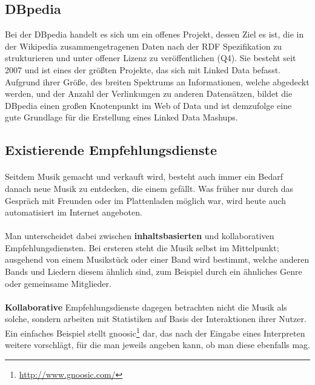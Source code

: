 \subsection{DBpedia}

Bei der DBpedia handelt es sich um ein offenes Projekt, dessen Ziel es ist, die in der Wikipedia zusammengetragenen Daten nach der RDF Spezifikation zu strukturieren und unter offener Lizenz zu veröffentlichen (Q4). Sie besteht seit 2007 und ist eines der größten Projekte, das sich mit Linked Data befasst. Aufgrund ihrer Größe, des breiten Spektrums an Informationen, welche abgedeckt werden, und der Anzahl der Verlinkungen zu anderen Datensätzen, bildet die DBpedia einen großen Knotenpunkt im Web of Data und ist demzufolge eine gute Grundlage für die Erstellung eines Linked Data Mashups.


\subsection{Existierende Empfehlungsdienste}
\paragraph{} Seitdem Musik gemacht und verkauft wird, besteht auch immer ein Bedarf danach neue Musik zu entdecken, die einem gefällt. Was früher nur durch das Gespräch mit Freunden oder im Plattenladen möglich war, wird heute auch automatisiert im Internet angeboten.

\paragraph{} Man unterscheidet dabei zwischen \textbf{inhaltsbasierten} und kollaborativen Empfehlungsdiensten. Bei ersteren steht die Musik selbst im Mittelpunkt; ausgehend von einem Musikstück oder einer Band wird bestimmt, welche anderen Bands und Liedern diesem ähnlich sind, zum Beispiel durch ein ähnliches Genre oder gemeinsame Mitglieder.

\paragraph{} \textbf{Kollaborative} Empfehlungsdienste dagegen betrachten nicht die Musik als solche, sondern arbeiten mit Statistiken auf Basis der Interaktionen ihrer Nutzer. Ein einfaches Beispiel stellt gnoosic\footnote{\url{http://www.gnoosic.com/}} dar, das nach der Eingabe eines Interpreten weitere vorschlägt, für die man jeweils angeben kann, ob man diese ebenfalls mag. 

